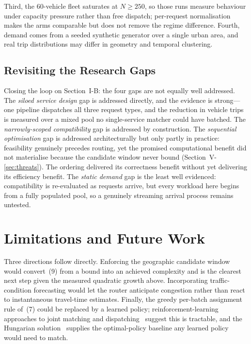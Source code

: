 \documentclass[conference]{IEEEtran}
\begin{document}
Third, the 60-vehicle fleet saturates at $N\ge250$, so those runs measure
behaviour under capacity pressure rather than free dispatch; per-request
normalisation makes the arms comparable but does not remove the regime
difference. Fourth, demand comes from a seeded synthetic generator over a
single urban area, and real trip distributions may differ in geometry and
temporal clustering.

\subsection{Revisiting the Research Gaps}
Closing the loop on Section~I-B: the four gaps are not equally well
addressed. The \emph{siloed service design} gap is addressed directly, and
the evidence is strong---one pipeline dispatches all three request types, and
the reduction in vehicle trips is measured over a mixed pool no
single-service matcher could have batched. The \emph{narrowly-scoped
compatibility} gap is addressed by construction. The \emph{sequential
optimisation} gap is addressed architecturally but only partly in practice:
feasibility genuinely precedes routing, yet the promised computational
benefit did not materialise because the candidate window never bound
(Section~V-\ref{sec:threats}). The ordering delivered its correctness
benefit without yet delivering its efficiency benefit. The \emph{static
demand} gap is the least well evidenced: compatibility is re-evaluated as
requests arrive, but every workload here begins from a fully populated pool,
so a genuinely streaming arrival process remains untested.

\section{Limitations and Future Work}
Three directions follow directly. Enforcing the geographic candidate window
would convert~(9) from a bound into an achieved complexity and is the
clearest next step given the measured quadratic growth above. Incorporating
traffic-condition forecasting would let the router anticipate congestion
rather than react to instantaneous travel-time estimates. Finally, the greedy
per-batch assignment rule of~(7) could be replaced by a learned policy;
reinforcement-learning approaches to joint matching and
dispatching~\cite{haliem2021,manchella2022} suggest this is tractable, and
the Hungarian solution~\cite{kuhn1955} supplies the optimal-policy baseline
any learned policy would need to match.
\end{document}
